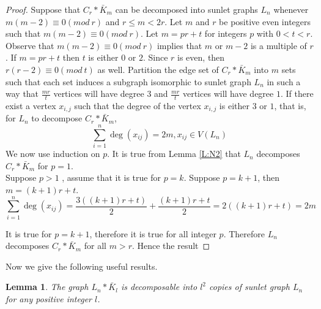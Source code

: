 \documentclass[12pt]{report}
\newtheorem{lem}[thm]{Lemma}
\begin{document}
\begin{proof}
Suppose that $C_{r}*\bar{K}_{m}$ can be decomposed into sunlet graphs $%
L_{n} $ whenever $m\left( m-2\right) \equiv 0\left( {mod}\ r\right)
$ and $r\leq m<2r$. Let $m$ and $r$ be positive even integers such
that $m\left( m-2\right) \equiv 0\left( {mod}\ r\right) $. Let
$m=pr+t$ for integers $p$ with $0<t<r$. Observe that $m\left(
m-2\right) \equiv 0\left( {mod}\
r\right) $ implies that $m$ or $m-2$ is a multiple of $r$. If $m=pr+t$ then $%
t $ is either $0$ or $2$. Since $r$ is even, then $r\left(
r-2\right) \equiv
0\left( {mod}\ t\right) $ as well. Partition the edge set of $C_{r}*\bar{K}%
_{m}$ into $m$ sets such that each set induces a subgraph isomorphic
to sunlet graph $L_{n}$ in such a way that $\frac{mr}{t}$ vertices
will have degree $3$ and $\frac{mr}{t}$ vertices will have degree
$1$. If there exist a vertex $x_{i,j}$ such that the degree of the
vertex $x_{i,j}$ is either $3$ or $1$, that is,  for $L_{n}$ to
decompose $C_{r}*\bar{K}_{m}$, $$\sum_{i=1}^{n}\deg
\left( x_{ij}\right) =2m, x_{ij}\in V\left( L_{n}\right) $$  We now use induction on $p$. It is true from Lemma \ref{L:N2} that $L_{n}$ decomposes $C_{r}*\bar{K}_{m}$ for $p=1$. \\ Suppose $p>1$%
, assume that it is true for $p=k$. Suppose $p=k+1$, then $m=\left(
k+1\right) r+t$.
$$\sum_{i=1}^{n}\deg \left( x_{ij}\right) =\frac{3\left( \left( k+1\right)
r+t\right) }{2}+\frac{\left( k+1\right) r+t}{2}=2\left( \left( k+1\right)
r+t\right) =2m$$

It is true for $p=k+1$, therefore it is true for all integer $p$. Therefore $%
L_{n}$ decomposes $C_{r}*\bar{K}_{m}$ for all $m>r$. Hence the
result
\end{proof}
Now we give the following useful results.
\begin{lem}\label{L:ABQ}
The graph $L_n*\bar{K}_l$ is decomposable into $l^2$ copies of
sunlet graph $L_n$ for any positive integer $l$.
\end{lem}
\end{document}

